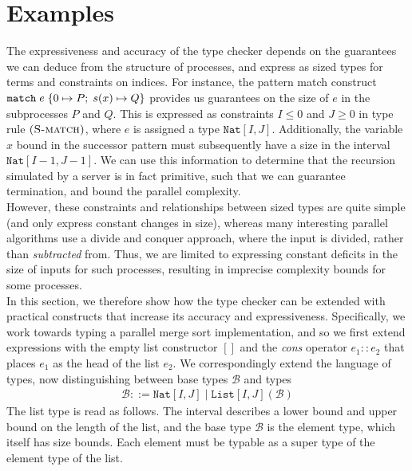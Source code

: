 \section{Examples}

The expressiveness and accuracy of the type checker depends on the guarantees we can deduce from the structure of processes, and express as sized types for terms and constraints on indices. For instance, the pattern match construct $\texttt{match}\; e\; \{ 0 \mapsto P;\; s(x) \mapsto Q \}$ provides us guarantees on the size of $e$ in the subprocesses $P$ and $Q$. This is expressed as constraints $I\leq 0$ and $J\geq 0$ in type rule $\mbox{\textsc{\protect{(S-match})}}$, where $e$ is assigned a type $\texttt{Nat}[I,J]$. Additionally, the variable $x$ bound in the successor pattern must subsequently have a size in the interval $\texttt{Nat}[I-1,J-1]$. We can use this information to determine that the recursion simulated by a server is in fact primitive, such that we can guarantee termination, and bound the parallel complexity.\\

However, these constraints and relationships between sized types are quite simple (and only express constant changes in size), whereas many interesting parallel algorithms use a divide and conquer approach, where the input is divided, rather than \textit{subtracted} from. Thus, we are limited to expressing constant deficits in the size of inputs for such processes, resulting in imprecise complexity bounds for some processes.\\

In this section, we therefore show how the type checker can be extended with practical constructs that increase its accuracy and expressiveness. Specifically, we work towards typing a parallel merge sort implementation, and so we first extend expressions with the empty list constructor $[]$ and the \textit{cons} operator $e_1 :: e_2$ that places $e_1$ as the head of the list $e_2$. We correspondingly extend the language of types, now distinguishing between base types $\mathcal{B}$ and types
\begin{align*}
    \mathcal{B} ::= \texttt{Nat}[I,J] \mid \texttt{List}[I,J](\mathcal{B})
\end{align*}
%
The list type is read as follows. The interval describes a lower bound and upper bound on the length of the list, and the base type $\mathcal{B}$ is the element type, which itself has size bounds. Each element must be typable as a super type of the element type of the list.\\

